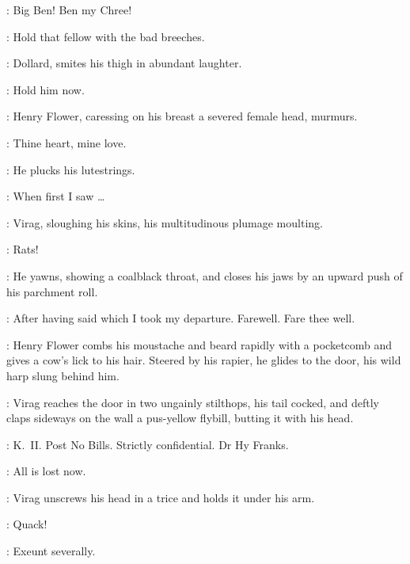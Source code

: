 \Virgins:
Big Ben!
Ben my Chree!

\Voice:
Hold that fellow with the bad breeches.

:
Dollard, smites his thigh in abundant laughter.

\BenDollard:
Hold him now.

:
Henry Flower, caressing on his breast a severed female head, murmurs.

\Henry:
Thine heart, mine love.

:
He plucks his lutestrings.

\Henry:
When first I saw \ldots

:
Virag, sloughing his skins, his multitudinous plumage moulting.

\Virag:
Rats!

:
He yawns, showing a coalblack throat,
and closes his jaws by an upward push of his parchment roll.

\Virag:
After having said which I took my departure.
Farewell.
Fare thee well.

:
Henry Flower combs his moustache and beard rapidly with a pocketcomb
and gives a cow's lick to his hair.
Steered by his rapier, he glides to the door, his wild harp slung behind him.

:
Virag reaches the door in two ungainly stilthops,
his tail cocked, and deftly claps sideways on the wall
a pus-yellow flybill, butting it with his head.

\Flybill[2]:
K.~II.
Post No Bills.
Strictly confidential.
Dr Hy Franks.

\Henry:
All is lost now.

:
Virag unscrews his head in a trice and holds it under his arm.

\ViragsHead:
Quack!

\All:
Exeunt severally.


